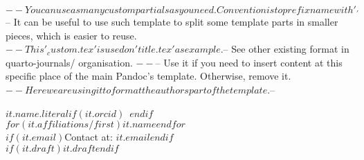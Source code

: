 $-- You can use as many custom partials as you need. Convention is to prefix name with '_'
$-- It can be useful to use such template to split some template parts in smaller pieces, which is easier to reuse. 
$-- This '_custom.tex' is used on 'title.tex' as example.
$-- See other existing format in quarto-journals/ organisation.
$-- %
$-- Use it if you need to insert content at this specific place of the main Pandoc's template. Otherwise, remove it.
$-- Here we are using it to format the authors part of the template.
$-- %

$it.name.literal$$if(it.orcid)$~$endif$\\$for(it.affiliations/first)$$it.name$$endfor$\\$if(it.email)$Contact at: \href{mailto:$it.email$}{$it.email$}$endif$\\$if(it.draft)$$it.draft$$endif$